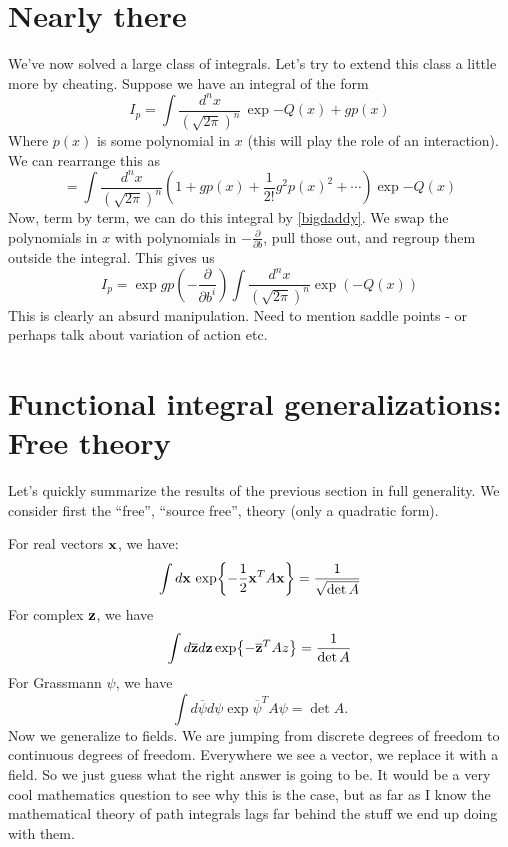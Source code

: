 \documentclass{book}
\begin{document}
\section{Nearly there}
We've now solved a large class of integrals. Let's try to extend this class a little more by cheating. Suppose we have an integral of the form 
\[
I_p = \int \frac{d^n x}{(\sqrt{2\pi})^n} \, \exp{-Q(x) + g p(x)}
\]
Where $p(x)$ is some polynomial in $x$ (this will play the role of an interaction). We can rearrange this as 
\[
= \int \frac{d^n x}{(\sqrt{2\pi})^n} \left(
1 + g p(x) + \frac{1}{2!}g^2 p(x)^2 + \cdots 
\right) \exp{-Q(x)}
\]
Now, term by term, we can do this integral by \ref{bigdaddy}. We swap the polynomials in $x$ with polynomials in $-\frac{\partial}{\partial b}$, pull those out, and regroup them outside the integral. This gives us
\[
I_p = \exp{g p \left( -\frac{\partial}{\partial b^i} \right)} \int \frac{d^n x}{(\sqrt{2\pi})^n}\exp (-Q(x))
\]
This is clearly an absurd manipulation. Need to mention saddle points - or perhaps talk about variation of action etc.

\newpage
\section{Functional integral generalizations: Free theory}
Let's quickly summarize the results of the previous section in full generality. We consider first the ``free'', ``source free'', theory (only a quadratic form). 

For real vectors $\mathbf{x}$, we have:
\begin{equation}
\int d\mathbf{x} \, \exp{-\frac{1}{2} \mathbf{x}^T A \mathbf{x} } = \frac{1}{\sqrt{\det A}}
\end{equation}
For complex $\mathbf{z}$, we have
\begin{equation}
\int d\overline{\mathbf{z}} d\mathbf{z} \exp{-\overline{\mathbf{z}}^T A z } = \frac{1}{\det A}
\end{equation}
For Grassmann $\psi$, we have
\begin{equation}
\int d\overline{\psi} d\psi \exp{\overline{\psi}^T A \psi} = \det A.
\end{equation}
Now we generalize to fields. We are jumping from discrete degrees of freedom to continuous degrees of freedom. Everywhere we see a vector, we replace it with a field. So we just guess what the right answer is going to be. It would be a very cool mathematics question to see why this is the case, but as far as I know the mathematical theory of path integrals lags far behind the stuff we end up doing with them.
\end{document}
